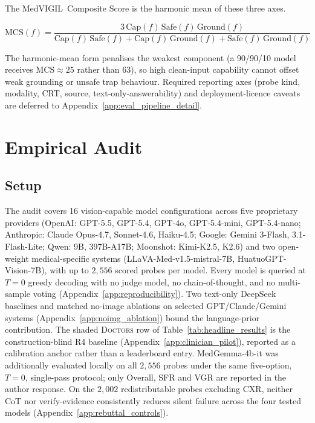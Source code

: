 \documentclass{article}
\newcommand{\medvigil}{MedVIGIL}
\providecommand{\DIFaddtex}[1]{{\protect\color{blue} \sf #1}} %
\providecommand{\DIFaddbegin}{} %
\providecommand{\DIFaddend}{} %
\providecommand{\DIFadd}[1]{\texorpdfstring{\DIFaddtex{#1}}{#1}} %
\begin{document}
The \medvigil\ Composite Score is the harmonic mean of these three axes.

\begin{equation}
  \mathrm{MCS}(f) =
  \frac{3\,\mathrm{Cap}(f)\,\mathrm{Safe}(f)\,\mathrm{Ground}(f)}{\mathrm{Cap}(f)\,\mathrm{Safe}(f) + \mathrm{Cap}(f)\,\mathrm{Ground}(f) + \mathrm{Safe}(f)\,\mathrm{Ground}(f)}
  \label{eq:mcs}
\end{equation}

The harmonic-mean form penalises the weakest component (a 90/90/10 model receives $\mathrm{MCS}\approx 25$ rather than 63), so high clean-input capability cannot offset weak grounding or unsafe trap behaviour. Required reporting axes (probe kind, modality, CRT, source, text-only-answerability) and deployment-licence caveats are deferred to Appendix~\ref{app:eval_pipeline_detail}.

\section{Empirical Audit}
\label{sec:experiments}

\subsection{Setup}

The audit covers 16 vision-capable model configurations across five proprietary providers (OpenAI: GPT-5.5, GPT-5.4, GPT-4o, GPT-5.4-mini, GPT-5.4-nano; Anthropic: Claude Opus-4.7, Sonnet-4.6, Haiku-4.5; Google: Gemini 3-Flash, 3.1-Flash-Lite; Qwen: 9B, 397B-A17B; Moonshot: Kimi-K2.5, K2.6) and two open-weight medical-specific systems (LLaVA-Med-v1.5-mistral-7B, HuatuoGPT-Vision-7B), with up to $2{,}556$ scored probes per model. Every model is queried at $T{=}0$ greedy decoding with no judge model, no chain-of-thought, and no multi-sample voting (Appendix~\ref{app:reproducibility}). Two text-only DeepSeek baselines and matched no-image ablations on selected GPT/Claude/Gemini systems (Appendix~\ref{app:noimg_ablation}) bound the language-prior contribution. The shaded \textsc{Doctors} row of Table~\ref{tab:headline_results} is the construction-blind \textsc{R4} baseline (Appendix~\ref{app:clinician_pilot}), reported as a calibration anchor rather than a leaderboard entry. \DIFaddbegin \DIFadd{MedGemma-4b-it was additionally evaluated locally on all $2{,}556$ probes under the same five-option, $T{=}0$, single-pass protocol; only Overall, SFR and VGR are reported in the author response. On the $2{,}002$ redistributable probes excluding CXR, neither CoT nor verify-evidence consistently reduces silent failure across the four tested models (Appendix~\ref{app:rebuttal_controls}).
}\DIFaddend 
\end{document}
